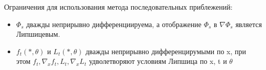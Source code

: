 \documentclass{article}
\begin{document}
Ограничения для использования метода последовательных приблежений:
\begin{itemize}
\item $\Phi_s$ дважды неприрывно дифференциируема, а отображение $\Phi_s$ в $\nabla \Phi_s$ является Липшицевым.
\item  $f_t(*,\theta)$ и $L_t(*,\theta)$ дважды неприрывно дифференцирумыми по x, при этом 
$f_t,\nabla_x f_t,L_t,\nabla_x L_t $ удволетворяют условиям Липшица  по  x, t и $\theta$

\end{itemize}
\end{document}
